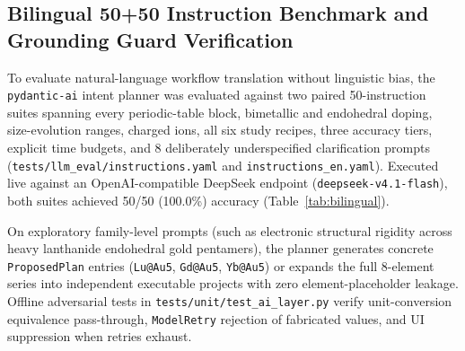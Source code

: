 \documentclass[journal=jctcce,manuscript=article]{achemso}
\begin{document}
\subsection{Bilingual 50+50 Instruction Benchmark and Grounding Guard Verification}

To evaluate natural-language workflow translation without linguistic bias, the \texttt{pydantic-ai} intent planner was evaluated against two paired 50-instruction suites spanning every periodic-table block, bimetallic and endohedral doping, size-evolution ranges, charged ions, all six study recipes, three accuracy tiers, explicit time budgets, and 8 deliberately underspecified clarification prompts (\texttt{tests/llm\_eval/instructions.yaml} and \texttt{instructions\_en.yaml}). Executed live against an OpenAI-compatible DeepSeek endpoint (\texttt{deepseek-v4.1-flash}), both suites achieved 50/50 (100.0\%) accuracy (Table~\ref{tab:bilingual}).

\begin{table}[htbp]
  \centering
  \caption{Category-Level Bilingual Natural-Language-to-Plan Evaluation on \texttt{deepseek-v4.1-flash} (50 Chinese + 50 Matched English Scientific Instructions)}
  \label{tab:bilingual}
  \footnotesize
  \setlength{\tabcolsep}{4pt}
\end{table}

On exploratory family-level prompts (such as electronic structural rigidity across heavy lanthanide endohedral gold pentamers), the planner generates concrete \texttt{ProposedPlan} entries (\texttt{Lu@Au5}, \texttt{Gd@Au5}, \texttt{Yb@Au5}) or expands the full 8-element series into independent executable projects with zero element-placeholder leakage. Offline adversarial tests in \texttt{tests/unit/test\_ai\_layer.py} verify unit-conversion equivalence pass-through, \texttt{ModelRetry} rejection of fabricated values, and UI suppression when retries exhaust.
\end{document}
